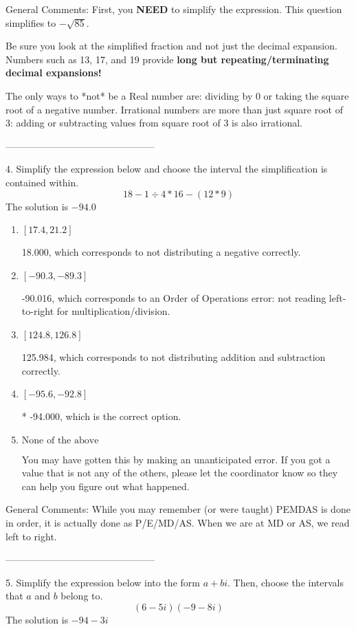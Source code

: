 \documentclass{article}[14pt]
\begin{document}
General Comments: First, you \textbf{NEED} to simplify the expression. This question simplifies to $-\sqrt{85}$. 
 
 Be sure you look at the simplified fraction and not just the decimal expansion. Numbers such as 13, 17, and 19 provide \textbf{long but repeating/terminating decimal expansions!} 
 
 The only ways to *not* be a Real number are: dividing by 0 or taking the square root of a negative number. Irrational numbers are more than just square root of 3: adding or subtracting values from square root of 3 is also irrational.

-----------------------------------------------

4. Simplify the expression below and choose the interval the simplification is contained within.
$$ 18 - 1 \div 4 * 16 - (12 * 9) $$ 
The solution is $ -94.0 $ 

\begin{enumerate}[label=\Alph*.] 
\item $ [17.4, 21.2] $ 

  18.000, which corresponds to not distributing a negative correctly. 
\item $ [-90.3, -89.3] $ 

  -90.016, which corresponds to an Order of Operations error: not reading left-to-right for multiplication/division. 
\item $ [124.8, 126.8] $ 

  125.984, which corresponds to not distributing addition and subtraction correctly. 
\item $ [-95.6, -92.8] $ 

 * -94.000, which is the correct option. 
\item $ \text{None of the above} $ 

  You may have gotten this by making an unanticipated error. If you got a value that is not any of the others, please let the coordinator know so they can help you figure out what happened. 
\end{enumerate} 
 
General Comments: While you may remember (or were taught) PEMDAS is done in order, it is actually done as P/E/MD/AS. When we are at MD or AS, we read left to right.

-----------------------------------------------

5. Simplify the expression below into the form $a+bi$. Then, choose the intervals that $a$ and $b$ belong to.
$$ (6  - 5 i)(-9  - 8 i) $$ 
The solution is $ -94  - 3 i $ 
\end{document}
